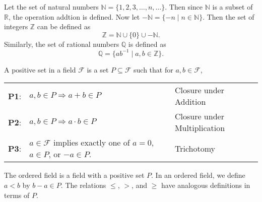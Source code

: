 \documentclass[../main.tex]{subfiles}
\begin{document}
Let the set of natural numbers $\mathbb{N} = \{1, 2, 3, \dots, n, \dots \}$.
Then since $\mathbb N$ is a subset of $\mathbb R$, the operation addtion is defined.
Now let $- \mathbb{N} = \{ -n \mid n \in \mathbb{N}\}$.
Then the set of integers $\mathbb Z$ can be defined as
\[
    \mathbb{Z} = \mathbb{N} \cup \{0\} \cup - \mathbb{N}.
\]
Similarly, the set of rational numbers $\mathbb{Q}$ is defined as
\[
    \mathbb{Q} = \{ a b^{-1} \mid a, b \in \mathbb{Z} \}.
\]

\begin{ax} \label{ax:order}
    A \textsf{positive set} in a field $\mathcal F$ is a set $P \subseteq \mathcal{F}$ such that for $a, b \in \mathcal{F}$,
    \begin{table}[H]
        \centering
        \begin{tabular}{lll}
            \textbf{P1}: & $a, b \in P \Rightarrow a + b \in P$                                          & Closure under Addition       \\
            \textbf{P2}: & $a, b \in P \Rightarrow a \cdot b \in P$                                      & Closure under Multiplication \\
            \textbf{P3}: & $a \in \mathcal{F}$ implies exactly one of $a = 0$, $a \in P$, or $-a \in P$. & Trichotomy
        \end{tabular}
    \end{table}
\end{ax}

The \textsf{ordered field} is a field with a positive set $P$.
In an ordered field, we define $a < b$ by $b - a \in P$.
The relations $\leq$, $>$, and $\geq$ have analogous definitions in terms of $P$.
\end{document}
